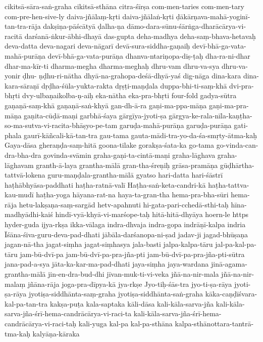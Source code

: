 {cikitsā-sāra-saṅ-graha 
cikitsā-sthāna
    citra-śīrṣa
com-men-taries
com-men-tary
com-pre-hen-sive-ly
daiva-jñālaṃ-kṛti
daiva-jñālaṅ-kṛti
    ḍākārṇava-mahā-yoginī-tan-tra-rāja
dakṣiṇa-pāścātyā
ḍalha-ṇa
dāmo-dara-sūnu-śārṅga-dharācārya-vi-racitā
darśanā-ṅkur-ābhi-dhayā
das-gupta
deha-madhya
deha-saṃ-bhava-hetavaḥ
deva-datta
deva-nagari
deva-nāgarī
devā-sura-siddha-gaṇaiḥ
devī-bhā-ga-vata-mahā-purāṇa
devī-bhā-ga-vata-purāṇa
dhanva-ntariṇopa-diṣ-ṭaḥ
dha-ra-ni-dhar
    dhar-ma-kīr-ti
dharma-megha
dharma-meghaḥ
dhru-vam
dhru-va-sya
dhru-va-yonir
ḍhu- ṇḍhu-ri-nātha
dhyā-na-grahopa-deśā-dhyā-yaś
    dig-nāga
dina-kara
dina-kara-sāraṇī
dṛḍha-śūla-yukta-rakta
dṛṣṭi-maṇḍala
duppa-bhi-ti-saṃ-khā
dvi-pra-bhṛti
dvy-ulbaṇaikolba-ṇ-aiḥ
eka-nātha
eka-pra-bhṛti
four-fold
    gadya-sūtra
gaṇaṇā-saṃ-khā
gaṇaṇā-saṅ-khyā
gan-dh-ā-ra
gaṇi-ma-ppa-māṇa
gaṇi-ma-pra-māṇa
gaṇita-cūḍā-maṇi
    garbhā-śaya
gārgīya-jyoti-ṣa
gārgya-ke-rala-nīla-kaṇṭha-so-ma-sutva-vi-racita-bhāṣyo-pe-tam
garuḍa-mahā-purāṇa
garuḍa-purāṇa
gati-phala
gaurī-kāñcali-kā-tan-tra
gau-tama
gauta-mādi-tra-yo-da-śa-smṛty-ātma-kaḥ
Gaya-dāsa
gheraṇḍa-saṃ-hitā
goona-tilake
gorakṣa-śata-ka
go-tama
go-vinda-can-dra-bha-dra
govinda-svāmin
graha-gaṇi-ta-cintā-maṇi
graha-lāghava
graha-lāghavam
granth-ā-laya
grantha-mālā
gran-tha-śreṇiḥ
grāsa-pramāṇa
    gūḍhārtha-tattvā-lokena
guru-maṇḍala-grantha-mālā
gyatso
hari-datta
hari-śāstrī
haṭhābhyāsa-paddhati
haṭha-ratnā-valī
Haṭha-saṅ-keta-candri-kā
haṭha-tattva-kau-mudī
haṭha-yoga
hāyana-rat-na
haya-ta-gran-tha
hema-pra-bha-sūri
hema-rāja
hetu-lakṣaṇa-saṃ-sargād
hetv-apahnuti
    hi-gata-pari-cchedā-sthi-taḥ 
hīna-madhyādhi-kaiś
hindī-vyā-khyā-vi-marśope-taḥ
    hitā-hitā-dhyāya
hoern-le
https
hyder-guda
ijya-rkṣa
ikka-vālaga
indra-dhvaja
indra-gopa
indrāṇī-kalpa
indria
Īśāna-śiva-guru-deva-pad-dhati
jābāla-darśanopa-ni-ṣad
jadav-ji
jagad-bhūṣaṇa
jagan-nā-tha
jagat-siṃha
jagat-siṃhasya
jala-basti
        jalpa-kalpa-tāru
jal-pa-kal-pa-tāru
jam-bū-dvī-pa
jam-bū-dvī-pa-pra-jña-pti
jam-bū-dvī-pa-pra-jña-pti-sūtra
jana-pad-a-sya
jāta-ka-kar-ma-pad-dhati
jaya-siṃha
jaya-wardana
jinā-agama-grantha-mālā
jin-en-dra-bud-dhi
jīvan-muk-ti-vi-veka
jñā-na-nir-mala
jñā-na-nir-malaṃ
jñāna-rāja
joga-pra-dīpya-kā
jya-rkṣe
Jyo-tiḥ-śās-tra
jyo-ti-ṣa-rāya
jyoti-ṣa-rāya
jyotiṣa-siddhānta-saṃ-graha
jyotiṣa-siddhānta-saṅ-graha
kāka-caṇḍīśvara-kal-pa-tan-tra
kakṣa-puṭa
kala-saptaka
kāli-dāsa
kali-kāla-sarva-jña
kali-kāla-sarva-jña-śrī-hema-candrācārya-vi-raci-ta
kali-kāla-sarva-jña-śrī-hema-candrācārya-vi-raci-taḥ
kali-yuga
kal-pa
kal-pa-sthāna
    kalpa-sthānottara-tantrā-tma-kaḥ 
kalyāṇa-kāraka
}
